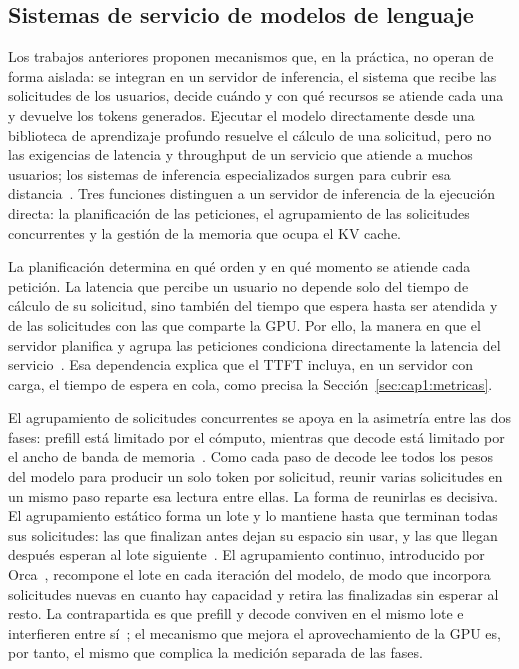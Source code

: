 \subsection{Sistemas de servicio de modelos de lenguaje}
\label{sec:cap1:servidores}

Los trabajos anteriores proponen mecanismos que, en la práctica, no operan de forma aislada: se integran en un servidor de inferencia, el sistema que recibe las solicitudes de los usuarios, decide cuándo y con qué recursos se atiende cada una y devuelve los tokens generados. Ejecutar el modelo directamente desde una biblioteca de aprendizaje profundo resuelve el cálculo de una solicitud, pero no las exigencias de latencia y throughput de un servicio que atiende a muchos usuarios; los sistemas de inferencia especializados surgen para cubrir esa distancia~\cite{aminabadi2022deepspeed}. Tres funciones distinguen a un servidor de inferencia de la ejecución directa: la planificación de las peticiones, el agrupamiento de las solicitudes concurrentes y la gestión de la memoria que ocupa el KV cache.

La planificación determina en qué orden y en qué momento se atiende cada petición. La latencia que percibe un usuario no depende solo del tiempo de cálculo de su solicitud, sino también del tiempo que espera hasta ser atendida y de las solicitudes con las que comparte la GPU. Por ello, la manera en que el servidor planifica y agrupa las peticiones condiciona directamente la latencia del servicio~\cite{li2023alpaserve}. Esa dependencia explica que el TTFT incluya, en un servidor con carga, el tiempo de espera en cola, como precisa la Sección~\ref{sec:cap1:metricas}.

El agrupamiento de solicitudes concurrentes se apoya en la asimetría entre las dos fases: prefill está limitado por el cómputo, mientras que decode está limitado por el ancho de banda de memoria~\cite{pope2023scaling}. Como cada paso de decode lee todos los pesos del modelo para producir un solo token por solicitud, reunir varias solicitudes en un mismo paso reparte esa lectura entre ellas. La forma de reunirlas es decisiva. El agrupamiento estático forma un lote y lo mantiene hasta que terminan todas sus solicitudes: las que finalizan antes dejan su espacio sin usar, y las que llegan después esperan al lote siguiente~\cite{yu2022orca}. El agrupamiento continuo, introducido por Orca~\cite{yu2022orca}, recompone el lote en cada iteración del modelo, de modo que incorpora solicitudes nuevas en cuanto hay capacidad y retira las finalizadas sin esperar al resto. La contrapartida es que prefill y decode conviven en el mismo lote e interfieren entre sí~\cite{agrawal2024sarathi}; el mecanismo que mejora el aprovechamiento de la GPU es, por tanto, el mismo que complica la medición separada de las fases.

